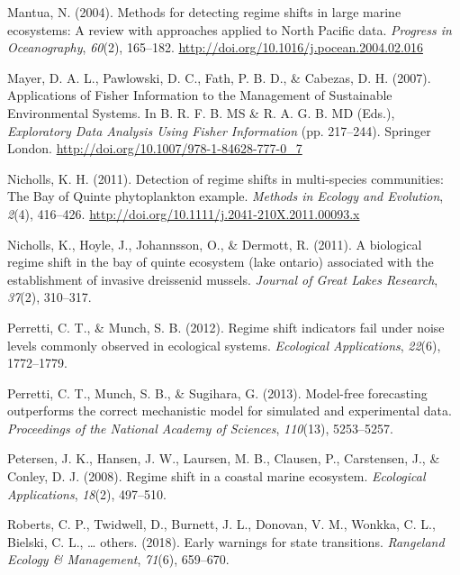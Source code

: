 \documentclass[12pt,twoside,openany]{reedthesis}
\begin{document}
\leavevmode\hypertarget{ref-mantua_methods_2004}{}%
Mantua, N. (2004). Methods for detecting regime shifts in large marine ecosystems: A review with approaches applied to North Pacific data. \emph{Progress in Oceanography}, \emph{60}(2), 165--182. \url{http://doi.org/10.1016/j.pocean.2004.02.016}

\leavevmode\hypertarget{ref-mayer_applications_2007}{}%
Mayer, D. A. L., Pawlowski, D. C., Fath, P. B. D., \& Cabezas, D. H. (2007). Applications of Fisher Information to the Management of Sustainable Environmental Systems. In B. R. F. B. MS \& R. A. G. B. MD (Eds.), \emph{Exploratory Data Analysis Using Fisher Information} (pp. 217--244). Springer London. \url{http://doi.org/10.1007/978-1-84628-777-0_7}

\leavevmode\hypertarget{ref-nicholls_detection_2011}{}%
Nicholls, K. H. (2011). Detection of regime shifts in multi-species communities: The Bay of Quinte phytoplankton example. \emph{Methods in Ecology and Evolution}, \emph{2}(4), 416--426. \url{http://doi.org/10.1111/j.2041-210X.2011.00093.x}

\leavevmode\hypertarget{ref-nicholls2011biological}{}%
Nicholls, K., Hoyle, J., Johannsson, O., \& Dermott, R. (2011). A biological regime shift in the bay of quinte ecosystem (lake ontario) associated with the establishment of invasive dreissenid mussels. \emph{Journal of Great Lakes Research}, \emph{37}(2), 310--317.

\leavevmode\hypertarget{ref-perretti2012regime}{}%
Perretti, C. T., \& Munch, S. B. (2012). Regime shift indicators fail under noise levels commonly observed in ecological systems. \emph{Ecological Applications}, \emph{22}(6), 1772--1779.

\leavevmode\hypertarget{ref-perretti_model-free_2013}{}%
Perretti, C. T., Munch, S. B., \& Sugihara, G. (2013). Model-free forecasting outperforms the correct mechanistic model for simulated and experimental data. \emph{Proceedings of the National Academy of Sciences}, \emph{110}(13), 5253--5257.

\leavevmode\hypertarget{ref-petersen2008regime}{}%
Petersen, J. K., Hansen, J. W., Laursen, M. B., Clausen, P., Carstensen, J., \& Conley, D. J. (2008). Regime shift in a coastal marine ecosystem. \emph{Ecological Applications}, \emph{18}(2), 497--510.

\leavevmode\hypertarget{ref-roberts2018early}{}%
Roberts, C. P., Twidwell, D., Burnett, J. L., Donovan, V. M., Wonkka, C. L., Bielski, C. L., \ldots{} others. (2018). Early warnings for state transitions. \emph{Rangeland Ecology \& Management}, \emph{71}(6), 659--670.
\end{document}
